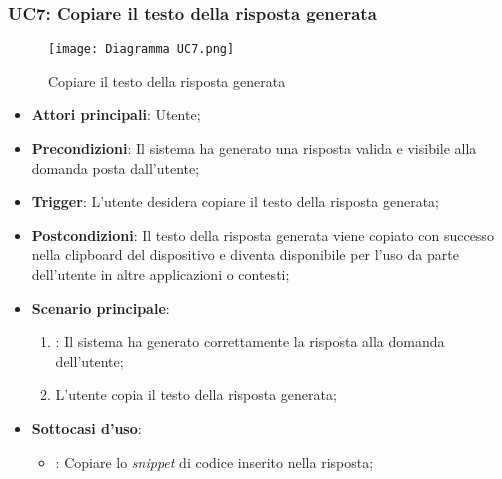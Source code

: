 \newpage
\hypertarget{UC7}{}
\subsubsection{UC7: Copiare il testo della risposta generata}

\begin{figure}[h]
    \centering
    \texttt{[image: Diagramma UC7.png]}
    \caption{Copiare il testo della risposta generata}
\end{figure}

\begin{itemize}
    \item \textbf{Attori principali}: Utente;
    \item \textbf{Precondizioni}: Il sistema ha generato una risposta valida e visibile alla domanda posta dall'utente;
    \item \textbf{Trigger}: L'utente desidera copiare il testo della risposta generata;
    \item \textbf{Postcondizioni}: Il testo della risposta generata viene copiato con successo nella clipboard del dispositivo e diventa disponibile per l'uso da parte dell'utente in altre applicazioni o contesti;
    \item \textbf{Scenario principale}:
    \begin{enumerate}
        \item {}: Il sistema ha generato correttamente la risposta alla domanda dell'utente;
        \item L'utente copia il testo della risposta generata;
    \end{enumerate}

    \item \textbf{Sottocasi d'uso}:
    \begin{itemize}
        \item {}: Copiare lo \emph{snippet} di codice inserito nella risposta;
    \end{itemize}
\end{itemize}


\hypertarget{UC7.1}{}

